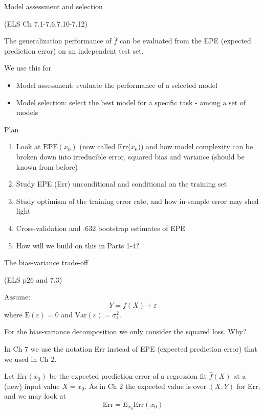 \documentclass[
  ignorenonframetext,
]{beamer}
\providecommand{\tightlist}{%
  \setlength{\itemsep}{0pt}\setlength{\parskip}{0pt}}
\begin{document}
\begin{frame}{Model assessment and selection}
\protect\hypertarget{model-assessment-and-selection}{}

(ELS Ch 7.1-7.6,7.10-7.12)

The generalization performance of \(\hat{f}\) can be evaluated from the
EPE (expected prediction error) on an independent test set.

We use this for

\begin{itemize}
\tightlist
\item
  Model assessment: evaluate the performance of a selected model
\item
  Model selection: select the best model for a specific task - among a
  set of models
\end{itemize}

\end{frame}

\begin{frame}

\begin{block}{Plan}

\begin{enumerate}
[1)]
\tightlist
\item
  Look at \(\text{EPE}(x_0)\) (now called Err(\(x_0\))) and how model
  complexity can be broken down into irreducible error, squared bias and
  variance (should be known from before)
\item
  Study EPE (Err) unconditional and conditional on the training set
\item
  Study optimism of the training error rate, and how in-sample error may
  shed light
\item
  Cross-validation and .632 bootstrap estimates of EPE
\item
  How will we build on this in Parts 1-4?
\end{enumerate}

\end{block}

\end{frame}

\begin{frame}

\begin{block}{The bias-variance trade-off}

(ELS p26 and 7.3)

Assume: \[ Y=f(X)+\varepsilon\] where \(\text{E}(\varepsilon)=0\) and
\(\text{Var}(\varepsilon)=\sigma_{\varepsilon}^2\).

For the bias-variance decomposition we only consider the squared loss.
Why?

In Ch 7 we use the notation Err instead of EPE (expected prediction
error) that we used in Ch 2.

Let \(\text{Err}(x_0)\) be the expected prediction error of a regression
fit \(\hat{f}(X)\) at a (new) input value \(X=x_0\). As in Ch 2 the
expected value is over \((X,Y)\) for Err, and we may look at
\[ \text{Err}=E_{x_0} \text{Err}(x_0)\]

\end{block}

\end{frame}
\end{document}
